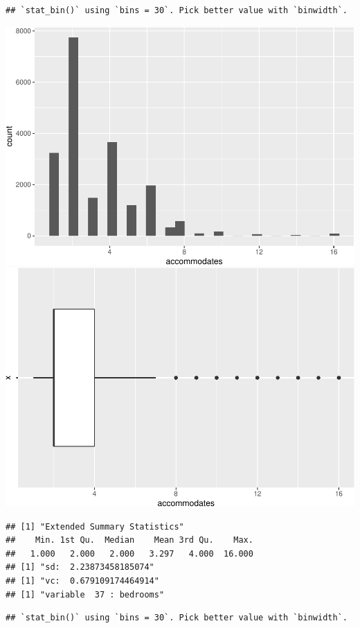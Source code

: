 \begin{verbatim}
## `stat_bin()` using `bins = 30`. Pick better value with `binwidth`.
\end{verbatim}

\includegraphics{anal_files/figure-latex/unnamed-chunk-9-16.pdf}
\includegraphics{anal_files/figure-latex/unnamed-chunk-9-17.pdf}

\begin{verbatim}
## [1] "Extended Summary Statistics"
##    Min. 1st Qu.  Median    Mean 3rd Qu.    Max. 
##   1.000   2.000   2.000   3.297   4.000  16.000 
## [1] "sd:  2.23873458185074"
## [1] "vc:  0.679109174464914"
## [1] "variable  37 : bedrooms"
\end{verbatim}

\begin{verbatim}
## `stat_bin()` using `bins = 30`. Pick better value with `binwidth`.
\end{verbatim}

